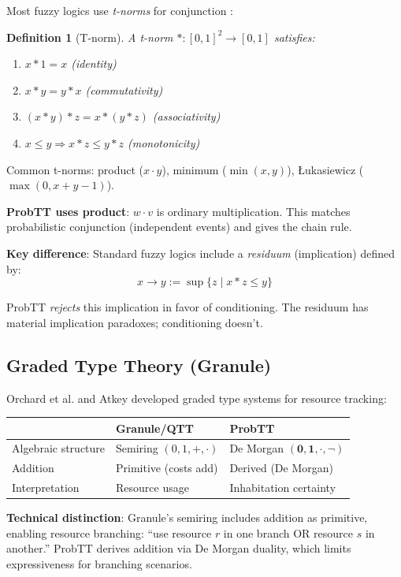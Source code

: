 \documentclass[11pt,a4paper]{article}
\newtheorem{definition}{Definition}[section]
\newcommand{\one}{\mathbf{1}}
\newcommand{\zero}{\mathbf{0}}
\newcommand{\negw}{\neg}
\begin{document}
Most fuzzy logics use \emph{t-norms} for conjunction \citep{klement2000triangular}:

\begin{definition}[T-norm]
A t-norm $* : [0,1]^2 \to [0,1]$ satisfies:
\begin{enumerate}
    \item $x * 1 = x$ (identity)
    \item $x * y = y * x$ (commutativity)
    \item $(x * y) * z = x * (y * z)$ (associativity)
    \item $x \leq y \Rightarrow x * z \leq y * z$ (monotonicity)
\end{enumerate}
\end{definition}

Common t-norms: product ($x \cdot y$), minimum ($\min(x,y)$), Łukasiewicz ($\max(0, x+y-1)$).

\textbf{ProbTT uses product}: $w \cdot v$ is ordinary multiplication. This matches probabilistic conjunction (independent events) and gives the chain rule.

\textbf{Key difference}: Standard fuzzy logics include a \emph{residuum} (implication) defined by:
\[
x \to y := \sup\{z \mid x * z \leq y\}
\]

ProbTT \emph{rejects} this implication in favor of conditioning. The residuum has material implication paradoxes; conditioning doesn't.

\subsection{Graded Type Theory (Granule)}

Orchard et al. \citep{orchard2019quantitative} and Atkey \citep{atkey2018syntax} developed graded type systems for resource tracking:

\begin{center}
\begin{tabular}{l|l|l}
& \textbf{Granule/QTT} & \textbf{ProbTT} \\
\hline
Algebraic structure & Semiring $(0,1,+,\cdot)$ & De Morgan $(\zero,\one,\cdot,\negw)$ \\
Addition & Primitive (costs add) & Derived (De Morgan) \\
Interpretation & Resource usage & Inhabitation certainty \\
\end{tabular}
\end{center}

\textbf{Technical distinction}: Granule's semiring includes addition as primitive, enabling resource branching: ``use resource $r$ in one branch OR resource $s$ in another.'' ProbTT derives addition via De Morgan duality, which limits expressiveness for branching scenarios.
\end{document}
